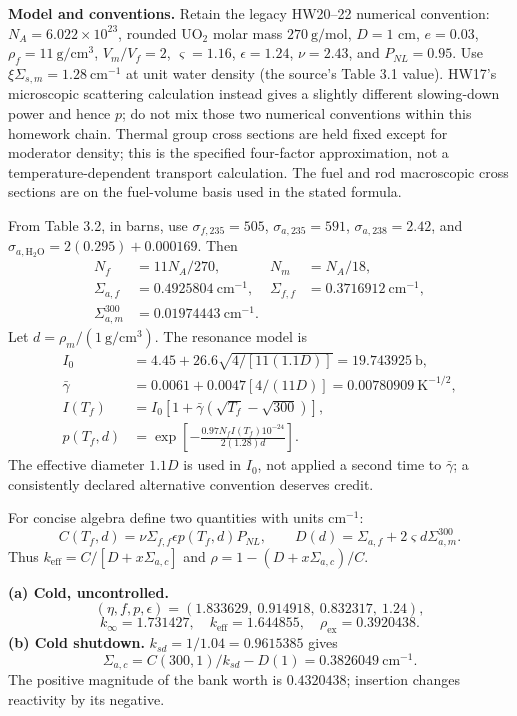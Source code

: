 \begin{adaptedsolution}

\textbf{Model and conventions.}
Retain the legacy HW20--22 numerical convention: $N_A=6.022\times10^{23}$,
rounded UO$_2$ molar mass $270~\mathrm{g/mol}$, $D=1$ cm,
$e=0.03$, $\rho_f=11~\mathrm{g/cm^3}$, $V_m/V_f=2$,
$\varsigma=1.16$, $\epsilon=1.24$, $\nu=2.43$, and $P_{NL}=0.95$.
Use $\xi\Sigma_{s,m}=1.28~\mathrm{cm^{-1}}$ at unit water density
(the source's Table 3.1 value). HW17's microscopic scattering calculation
instead gives a slightly different slowing-down power and hence $p$;
do not mix those two numerical conventions within this homework chain.
Thermal group cross sections are held fixed except for moderator density;
this is the specified four-factor approximation, not a temperature-dependent
transport calculation. The fuel and rod macroscopic cross sections are on
the fuel-volume basis used in the stated formula.

From Table 3.2, in barns, use
$\sigma_{f,235}=505$, $\sigma_{a,235}=591$,
$\sigma_{a,238}=2.42$, and
$\sigma_{a,\mathrm{H_2O}}=2(0.295)+0.000169$.
Then
\begin{align*}
N_f&=11N_A/270,&N_m&=N_A/18,\\
\Sigma_{a,f}&=0.4925804~\mathrm{cm^{-1}},&
\Sigma_{f,f}&=0.3716912~\mathrm{cm^{-1}},\\
\Sigma_{a,m}^{300}&=0.01974443~\mathrm{cm^{-1}}.
\end{align*}
Let $d=\rho_m/(1~\mathrm{g/cm^3})$. The resonance model is
\begin{align*}
I_0&=4.45+26.6\sqrt{4/[11(1.1D)]}=19.743925~\mathrm b,\\
\bar\gamma&=0.0061+0.0047[4/(11D)]=0.00780909~\mathrm{K^{-1/2}},\\
I(T_f)&=I_0[1+\bar\gamma(\sqrt{T_f}-\sqrt{300})],\\
p(T_f,d)&=\exp\left[-\frac{0.97N_f I(T_f)10^{-24}}{2(1.28)d}\right].
\end{align*}
The effective diameter $1.1D$ is used in $I_0$, not applied a second time
to $\bar\gamma$; a consistently declared alternative convention deserves credit.

For concise algebra define two quantities with units $\mathrm{cm^{-1}}$:
\[
C(T_f,d)=\nu\Sigma_{f,f}\epsilon p(T_f,d)P_{NL},\qquad
D(d)=\Sigma_{a,f}+2\varsigma d\Sigma_{a,m}^{300}.
\]
Thus $k_{\mathrm{eff}}=C/[D+x\Sigma_{a,c}]$ and
$\rho=1-(D+x\Sigma_{a,c})/C$.

\textbf{(a) Cold, uncontrolled.}
\[
(\eta,f,p,\epsilon)=(1.833629,\ 0.914918,\ 0.832317,\ 1.24),
\]
\[
k_\infty=1.731427,\quad k_{\mathrm{eff}}=1.644855,\quad
\boxed{\rho_{\mathrm{ex}}=0.3920438}.
\]
\textbf{(b) Cold shutdown.} $k_{sd}=1/1.04=0.9615385$ gives
\[
\boxed{\Sigma_{a,c}=C(300,1)/k_{sd}-D(1)=0.3826049~\mathrm{cm^{-1}}}.
\]
The positive magnitude of the bank worth is $0.4320438$; insertion changes
reactivity by its negative.


\end{adaptedsolution}

